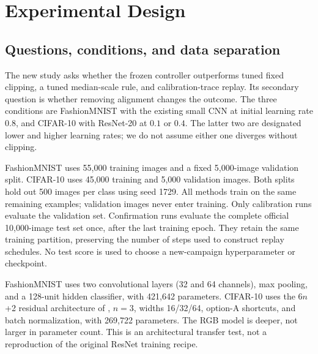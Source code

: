 \documentclass{article}
\begin{document}
\section{Experimental Design}
\subsection{Questions, conditions, and data separation}
The new study asks whether the frozen controller outperforms tuned fixed
clipping, a tuned median-scale rule, and calibration-trace replay. Its
secondary question is whether removing alignment changes the outcome.
The three conditions are FashionMNIST with the existing small CNN at initial
learning rate $0.8$, and CIFAR-10 with ResNet-20 at $0.1$ or $0.4$.
The latter two are designated lower and higher learning rates; we do not
assume either one diverges without clipping.

FashionMNIST \citep{xiao2017fashion} uses 55,000 training images and a fixed
5,000-image validation split. CIFAR-10 \citep{krizhevsky2009learning} uses
45,000 training and 5,000 validation images. Both splits hold out 500 images
per class using seed 1729. All methods train on the same remaining examples;
validation images never enter training. Only calibration runs evaluate the
validation set. Confirmation runs evaluate the complete official 10,000-image
test set once, after the last training epoch. They retain the same training
partition, preserving the number of steps used to construct replay schedules.
No test score is used to choose a new-campaign hyperparameter or checkpoint.

FashionMNIST uses two convolutional layers (32 and 64 channels), max pooling,
and a 128-unit hidden classifier, with 421,642 parameters. CIFAR-10 uses the
6$n$+2 residual architecture of \citet{he2016deep}, $n=3$, widths 16/32/64,
option-A shortcuts, and batch normalization, with 269,722 parameters. The
RGB model is deeper, not larger in parameter count. This is an architectural
transfer test, not a reproduction of the original ResNet training recipe.


%
\begin{table}[t]
\centering\small
\caption{Final test accuracy (percent), mean $\pm$ Student-$t$ 95\% interval
half-width over twelve paired training seeds. Hyperparameters are selected
using the validation set. Failures are retained at zero accuracy.}
\label{tab:accuracy}

\end{table}

%
\begin{table}[t]
\centering\small
\caption{Primary paired comparisons in percentage points: DAGC minus the
comparator. Intervals are unadjusted 95\% paired $t$ intervals; $p_H$ is the
exact two-sided sign-flip $p$-value after Holm adjustment over all nine tests.
Win counts exclude ties.}
\label{tab:paired}

\end{table}
\end{document}
